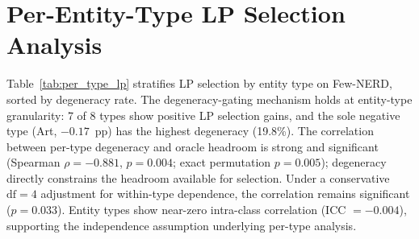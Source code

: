 \section{Per-Entity-Type LP Selection Analysis}\label{app:per_type_lp}

Table~\ref{tab:per_type_lp} stratifies LP selection by entity type on Few-NERD, sorted by degeneracy rate.
The degeneracy-gating mechanism holds at entity-type granularity: 7 of 8 types show positive LP selection gains, and the sole negative type (Art, $-0.17$~pp) has the highest degeneracy (19.8\%).
The correlation between per-type degeneracy and oracle headroom is strong and significant (Spearman $\rho{=}{-}0.881$, $p{=}0.004$; exact permutation $p{=}0.005$); degeneracy directly constrains the headroom available for selection.
Under a conservative $\text{df}{=}4$ adjustment for within-type dependence, the correlation remains significant ($p{=}0.033$).
Entity types show near-zero intra-class correlation (ICC $= -0.004$), supporting the independence assumption underlying per-type analysis.

\begin{table}[h]
\centering
\small
\caption{Per-entity-type LP selection on Few-NERD INTRA coarse (Qwen3-8B, $N{=}8$, $T{=}1.0$), sorted by degeneracy. LP $\Delta$: LP selection F1 minus greedy. 7/8 types show positive $\Delta$; Art (highest degeneracy) is the sole exception.}
\label{tab:per_type_lp}
\end{table}

